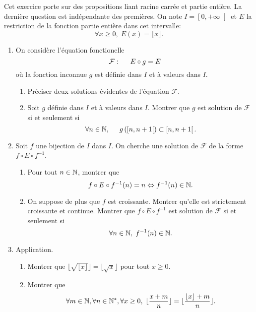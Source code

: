 \noindent
Cet exercice porte sur des propositions liant racine carrée et partie entière. La dernière question est indépendante des premières.\newline
On note $I = \left[ 0, + \infty \right[$ et $E$ la restriction de la fonction partie entière dans cet intervalle:
\[
  \forall x \geq 0, \; E(x) = \lfloor x \rfloor.
\]

\begin{enumerate}
  \item On considère l'équation fonctionelle
  \[
    \mathcal{F}: \hspace{0.5cm} E \circ g = E
  \]
où la fonction inconnue $g$ est définie dans $I$ et à valeurs dans $I$.
\begin{enumerate}
  \item Préciser deux solutions évidentes de l'équation $\mathcal{F}$.
  \item Soit $g$ définie dans $I$ et à valeurs dans $I$.\newline
  Montrer que $g$ est solution de $\mathcal{F}$ si et seulement si
\[
  \forall n \in \mathbb{N},\hspace{0.5cm}
  g\left( \left[ n,n+1 \right[\right) \subset \left[ n, n+1 \right[ .
\]
\end{enumerate}

  \item Soit $f$ une bijection de $I$ dans $I$. On cherche une solution de $\mathcal{F}$ de la forme $f \circ E \circ f^{-1}$.
\begin{enumerate}
  \item Pour tout $n\in \mathbb{N}$, montrer que 
\[
  f \circ E \circ f^{-1} (n) = n \Leftrightarrow f^{-1}(n) \in \mathbb{N}.
\]
  \item On suppose de plus que $f$ est croissante. Montrer qu'elle est strictement croissante et continue. Montrer que $f \circ E \circ f^{-1}$ est solution de $\mathcal{F}$ si et seulement si 
  \[
    \forall n \in \mathbb{N}, \; f^{-1}(n) \in \mathbb{N}.
  \]
\end{enumerate}

  \item Application.
  \begin{enumerate}
    \item Montrer que $\lfloor \sqrt{ \lfloor x \rfloor} \rfloor = \lfloor \sqrt{x} \rfloor$ pour tout $x \geq 0$.
    \item Montrer que 
\[
  \forall m \in \mathbb{N}, \forall n \in \mathbb{N}^*, \forall x \geq 0, \; \lfloor \frac{x + m}{n} \rfloor = \lfloor \frac{\lfloor x \rfloor + m}{n} \rfloor.
\]


\end{enumerate}
\end{enumerate}
